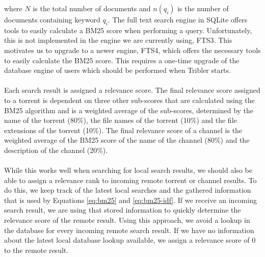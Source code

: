 where $ N $ is the total number of documents and $ n(q_i) $ is the number of documents containing keyword $ q_i $. The full text search engine in SQLite offers tools to easily calculate a BM25 score when performing a query. Unfortunately, this is not implemented in the engine we are currently using, FTS3. This motivates us to upgrade to a newer engine, FTS4, which offers the necessary tools to easily calculate the BM25 score. This requires a one-time upgrade of the database engine of users which should be performed when Tribler starts.\\\\
Each search result is assigned a relevance score. The final relevance score assigned to a torrent is dependent on three other sub-scores that are calculated using the BM25 algorithm and is a weighted average of the sub-scores, determined by the name of the torrent (80\%), the file names of the torrent (10\%) and the file extensions of the torrent (10\%). The final relevance score of a channel is the weighted average of the BM25 score of the name of the channel (80\%) and the description of the channel (20\%).\\\\
While this works well when searching for local search results, we should also be able to assign a relevance rank to incoming remote torrent or channel results. To do this, we keep track of the latest local searches and the gathered information that is used by Equations \ref{eq:bm25} and \ref{eq:bm25-idf}. If we receive an incoming search result, we are using that stored information to quickly determine the relevance score of the remote result. Using this approach, we avoid a lookup in the database for every incoming remote search result. If we have no information about the latest local database lookup available, we assign a relevance score of 0 to the remote result.

